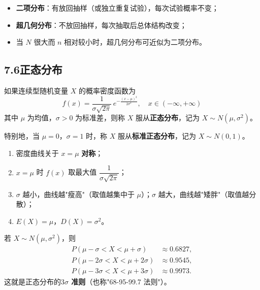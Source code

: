 \documentclass[12pt, a4paper]{ctexart}
\begin{document}
\begin{warnbox}[二项分布与超几何分布的区别]
\begin{itemize}
  \item \textbf{二项分布}：有放回抽样（或独立重复试验），每次试验概率不变；
  \item \textbf{超几何分布}：不放回抽样，每次抽取后总体结构改变；
  \item 当 $N$ 很大而 $n$ 相对较小时，超几何分布可近似为二项分布。
\end{itemize}
\end{warnbox}

\subsection*{7.6\quad 正态分布}

\begin{knowledgebox}[正态分布]
如果连续型随机变量 $X$ 的概率密度函数为
\[
f(x) = \frac{1}{\sigma\sqrt{2\pi}} \, e^{-\frac{(x - \mu)^2}{2\sigma^2}}, \quad x \in (-\infty, +\infty)
\]
其中 $\mu$ 为均值，$\sigma > 0$ 为标准差，则称 $X$ 服从\textbf{正态分布}，记为 $X \sim N(\mu, \sigma^2)$。

特别地，当 $\mu = 0$，$\sigma = 1$ 时，称 $X$ 服从\textbf{标准正态分布}，记为 $X \sim N(0, 1)$。
\end{knowledgebox}

\begin{knowledgebox}[正态分布的性质]
\begin{enumerate}[label=(\arabic*)]
  \item 密度曲线关于 $x = \mu$ \textbf{对称}；
  \item $x = \mu$ 时 $f(x)$ 取最大值 $\dfrac{1}{\sigma\sqrt{2\pi}}$；
  \item $\sigma$ 越小，曲线越"瘦高"（取值越集中于 $\mu$）；$\sigma$ 越大，曲线越"矮胖"（取值越分散）；
  \item $E(X) = \mu$，$D(X) = \sigma^2$。
\end{enumerate}
\end{knowledgebox}

\begin{knowledgebox}[$3\sigma$ 准则]
若 $X \sim N(\mu, \sigma^2)$，则
\begin{align*}
P(\mu - \sigma < X < \mu + \sigma) &\approx 0.6827, \\
P(\mu - 2\sigma < X < \mu + 2\sigma) &\approx 0.9545, \\
P(\mu - 3\sigma < X < \mu + 3\sigma) &\approx 0.9973.
\end{align*}
这就是正态分布的\textbf{$3\sigma$ 准则}（也称"68-95-99.7 法则"）。
\end{knowledgebox}
\end{document}
